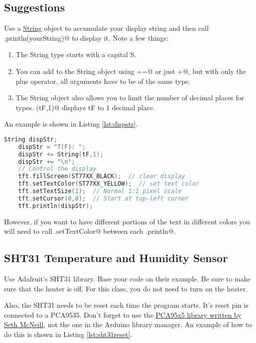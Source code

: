 \subsection{Suggestions}
Use a \href{https://www.arduino.cc/reference/en/language/variables/data-types/stringobject/}{String} 
object to accumulate your display string and then call \lstinline@display.println(yourString)@ 
to display it. Note a few things:
\begin{enumerate}
	\item The String type starts with a capital S.
	\item You can add to the String object using \lstinline@+=@ or just \lstinline@+@, 
		but with only the plus operator, all arguments have to be of the same type. 
	\item The String object also allows you to limit the number of decimal places for \lstinline@float@ types.
            \lstinline@String(tF,1)@ displays tF to 1 decimal place.
\end{enumerate}
An example is shown in Listing \ref{lst:dispstr}.
\begin{lstlisting}[caption={This is an example of using a String 
		object to display text and float variables. The floats are 
		limited to 1 decimal place such that 7.123 would be displayed as 7.1.},
		label={lst:dispstr},language=C++]
	String dispStr;
	dispStr = "T(F): ";
	dispStr += String(tF,1);
	dispStr += "\n";
	// Control the display  
	tft.fillScreen(ST77XX_BLACK);  // clear display
	tft.setTextColor(ST77XX_YELLOW);  // set text color
	tft.setTextSize(1);  // Normal 1:1 pixel scale
	tft.setCursor(0,0);  // Start at top-left corner
	tft.println(dispStr);
\end{lstlisting}
However, if you want to have different portions of the text in different colors you will
need to call \lstinline@tft.setTextColor@ between each \lstinline@tft.println@.

\subsection{SHT31 Temperature and Humidity Sensor}
Use Adafruit's SHT31 library. Base your code on their example. Be sure 
to make sure that the heater is off. For this class, you do not need to 
turn on the heater.

Also, the SHT31 needs to be reset each time the program starts. It's 
reset pin is connected to a PCA9535. Don't forget to use the 
\href{https://github.com/semcneil/PCA95x5}{PCA95x5 library written by Seth McNeill}, 
not the one in the Arduino library manager. An example of how to do this
is shown in Listing \ref{lst:sht31reset}.

